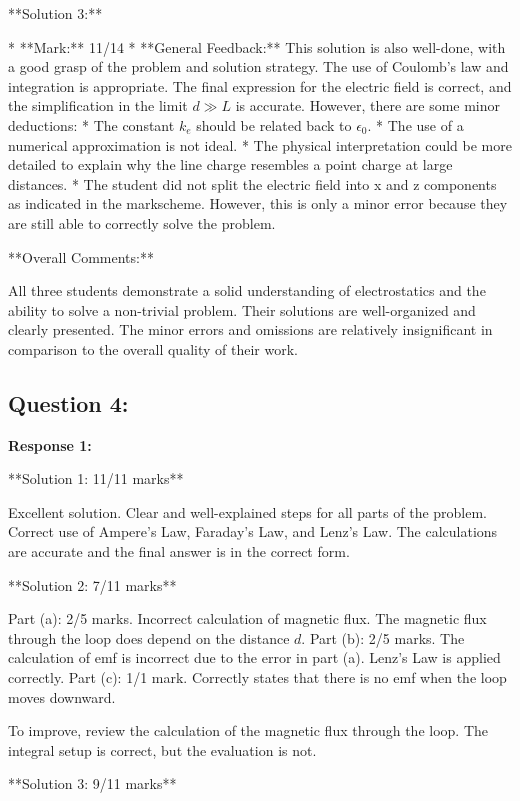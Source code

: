 \documentclass[a4paper,11pt]{article}
\begin{document}
**Solution 3:**

* **Mark:** 11/14
* **General Feedback:** This solution is also well-done, with a good grasp of the problem and solution strategy. The use of Coulomb's law and integration is appropriate. The final expression for the electric field is correct, and the simplification in the limit \(d \gg L\) is accurate. However, there are some minor deductions:
    * The constant \(k_e\) should be related back to \( \epsilon_0 \).
    * The use of a numerical approximation is not ideal.
    * The physical interpretation could be more detailed to explain why the line charge resembles a point charge at large distances.
    * The student did not split the electric field into x and z components as indicated in the markscheme. However, this is only a minor error because they are still able to correctly solve the problem. 

**Overall Comments:**

All three students demonstrate a solid understanding of electrostatics and the ability to solve a non-trivial problem. Their solutions are well-organized and clearly presented. The minor errors and omissions are relatively insignificant in comparison to the overall quality of their work.  


\subsection*{Question 4:}

\textbf{Response 1:}

**Solution 1: 11/11 marks**

Excellent solution. Clear and well-explained steps for all parts of the problem. Correct use of Ampere's Law, Faraday's Law, and Lenz's Law. The calculations are accurate and the final answer is in the correct form.

**Solution 2: 7/11 marks**

Part (a): 2/5 marks. Incorrect calculation of magnetic flux. The magnetic flux through the loop does depend on the distance \( d \).
Part (b): 2/5 marks. The calculation of emf is incorrect due to the error in part (a). Lenz's Law is applied correctly.
Part (c): 1/1 mark. Correctly states that there is no emf when the loop moves downward.

To improve, review the calculation of the magnetic flux through the loop. The integral setup is correct, but the evaluation is not.

**Solution 3: 9/11 marks**
\end{document}

